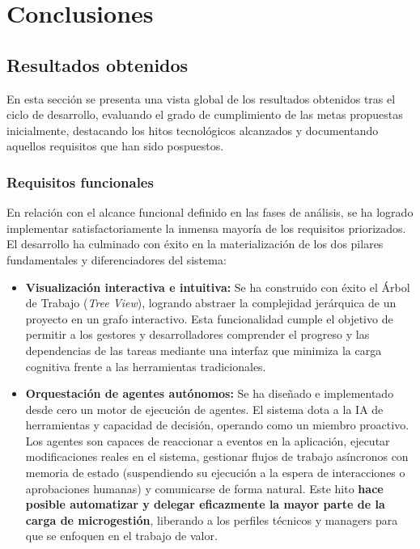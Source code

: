 \chapter{Conclusiones}
\label{chap:conclusiones}

\section{Resultados obtenidos}
En esta sección se presenta una vista global de los resultados obtenidos tras el ciclo de desarrollo, evaluando el grado de cumplimiento de las metas propuestas inicialmente, destacando los hitos tecnológicos alcanzados y documentando aquellos requisitos que han sido pospuestos.

\subsection{Requisitos funcionales}
En relación con el alcance funcional definido en las fases de análisis, se ha logrado implementar satisfactoriamente la inmensa mayoría de los requisitos priorizados. El desarrollo ha culminado con éxito en la materialización de los dos pilares fundamentales y diferenciadores del sistema:

\begin{itemize}
    \item \textbf{Visualización interactiva e intuitiva:} Se ha construido con éxito el Árbol de Trabajo (\emph{Tree View}), logrando abstraer la complejidad jerárquica de un proyecto en un grafo interactivo. Esta funcionalidad cumple el objetivo de permitir a los gestores y desarrolladores comprender el progreso y las dependencias de las tareas mediante una interfaz que minimiza la carga cognitiva frente a las herramientas tradicionales.
    \item \textbf{Orquestación de agentes autónomos:} Se ha diseñado e implementado desde cero un motor de ejecución de agentes. El sistema dota a la \ac{IA} de herramientas y capacidad de decisión, operando como un miembro proactivo. Los agentes son capaces de reaccionar a eventos en la aplicación, ejecutar modificaciones reales en el sistema, gestionar flujos de trabajo asíncronos con memoria de estado (suspendiendo su ejecución a la espera de interacciones o aprobaciones humanas) y comunicarse de forma natural. Este hito \textbf{hace posible automatizar y delegar eficazmente la mayor parte de la carga de microgestión}, liberando a los perfiles técnicos y managers para que se enfoquen en el trabajo de valor.
\end{itemize}


